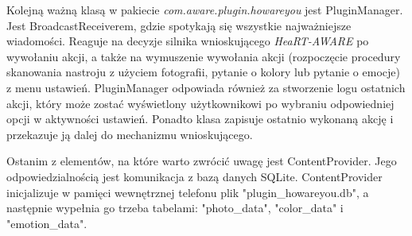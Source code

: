 Kolejną ważną klasą w pakiecie \textit{com.aware.plugin.howareyou} jest PluginManager. Jest BroadcastReceiverem, gdzie spotykają się wszystkie najważniejsze wiadomości. Reaguje na decyzje silnika wnioskującego \textit{HeaRT-AWARE} po wywołaniu akcji, a także na wymuszenie wywołania akcji (rozpoczęcie procedury skanowania nastroju z użyciem fotografii, pytanie o kolory lub pytanie o emocje) z menu ustawień. PluginManager odpowiada również za stworzenie logu ostatnich akcji, który może zostać wyświetlony użytkownikowi po wybraniu odpowiedniej opcji w aktywności ustawień. Ponadto klasa zapisuje ostatnio wykonaną akcję i przekazuje ją dalej do mechanizmu wnioskującego.

Ostanim z elementów, na które warto zwrócić uwagę jest ContentProvider. Jego odpowiedzialnością jest komunikacja z bazą danych SQLite. ContentProvider inicjalizuje w pamięci wewnętrznej telefonu plik "plugin\_howareyou.db", a następnie wypełnia go trzeba tabelami: "photo\_data", "color\_data" i "emotion\_data".

